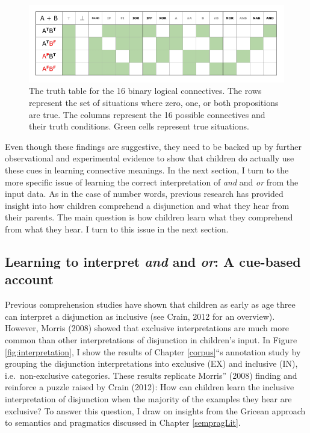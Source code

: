 \documentclass[floatsintext,man]{apa6}
\theoremstyle{definition}
\theoremstyle{definition}
\theoremstyle{definition}
\theoremstyle{remark}
\begin{document}
\begin{figure}[tb]

{\centering \includegraphics{figs/binaryLogicalConnectivess-1} 

}

\caption{The truth table for the 16 binary logical connectives. The rows represent the set of situations where zero, one, or both propositions are true. The columns represent the 16 possible connectives and their truth conditions. Green cells represent true situations.}\label{fig:binaryLogicalConnectivess}
\end{figure}

Even though these findings are suggestive, they need to be backed up by
further observational and experimental evidence to show that children do
actually use these cues in learning connective meanings. In the next
section, I turn to the more specific issue of learning the correct
interpretation of \emph{and} and \emph{or} from the input data. As in
the case of number words, previous research has provided insight into
how children comprehend a disjunction and what they hear from their
parents. The main question is how children learn what they comprehend
from what they hear. I turn to this issue in the next section.

\subsection{\texorpdfstring{Learning to interpret \emph{and} and
\emph{or}: A cue-based
account}{Learning to interpret and and or: A cue-based account}}\label{myaccount}

Previous comprehension studies have shown that children as early as age
three can interpret a disjunction as inclusive (see Crain, 2012 for an
overview). However, Morris (2008) showed that exclusive interpretations
are much more common than other interpretations of disjunction in
children's input. In Figure \ref{fig:interpretation}, I show the results
of Chapter \ref{corpus}\enquote{s annotation study by grouping the
disjunction interpretations into exclusive (EX) and inclusive (IN),
i.e.~non-exclusive categories. These results replicate Morris} (2008)
finding and reinforce a puzzle raised by Crain (2012): How can children
learn the inclusive interpretation of disjunction when the majority of
the examples they hear are exclusive? To answer this question, I draw on
insights from the Gricean approach to semantics and pragmatics discussed
in Chapter \ref{sempragLit}.
\end{document}

